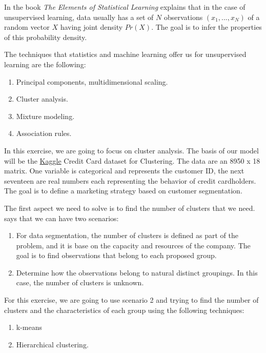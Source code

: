 \documentclass[11pt,]{article}
\providecommand{\tightlist}{%
\setlength{\itemsep}{0pt}\setlength{\parskip}{0pt}}
\begin{document}
In the book \emph{The Elements of Statistical Learning}
\citet{xie2013ddrk} explains that in the case of unsupervised learning,
data usually has a set of \(N\) observations \((x_{1}, ..., x_{N})\) of
a random vector \(X\) having joint density \(Pr(X)\). The goal is to
infer the properties of this probability density.

The techniques that statistics and machine learning offer us for
unsupervised learning are the following:

\begin{enumerate}
\def\labelenumi{\arabic{enumi})}
\tightlist
\item
  Principal components, multidimensional scaling.
\item
  Cluster analysis.
\item
  Mixture modeling.
\item
  Association rules.
\end{enumerate}

In this exercise, we are going to focus on cluster analysis. The basis
of our model will be the
\href{https://www.kaggle.com/arjunbhasin2013/ccdata}{Kaggle} Credit Card
dataset for Clustering. The data are an 8950 x 18 matrix. One variable
is categorical and represents the customer ID, the next seventeen are
real numbers each representing the behavior of credit cardholders. The
goal is to define a marketing strategy based on customer segmentation.

The first aspect we need to solve is to find the number of clusters that
we need. \citet{xie2013ddrk} says that we can have two scenarios:

\begin{enumerate}
\def\labelenumi{\arabic{enumi})}
\item
  For data segmentation, the number of clusters is defined as part of
  the problem, and it is base on the capacity and resources of the
  company. The goal is to find observations that belong to each proposed
  group.
\item
  Determine how the observations belong to natural distinct groupings.
  In this case, the number of clusters is unknown.
\end{enumerate}

For this exercise, we are going to use scenario 2 and trying to find the
number of clusters and the characteristics of each group using the
following techniques:

\begin{enumerate}
\def\labelenumi{\arabic{enumi})}
\tightlist
\item
  k-means
\item
  Hierarchical clustering.
\end{enumerate}
\end{document}
